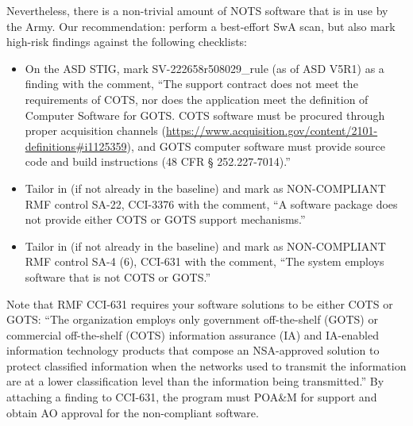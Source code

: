 Nevertheless, there is a non-trivial amount of NOTS software that is in use by the Army. Our recommendation: perform a best-effort SwA scan, but also mark high-risk findings against the following checklists:
\begin{itemize}
	\item On the ASD STIG, mark SV-222658r508029\_rule (as of ASD V5R1) as a finding with the comment, ``The support contract does not meet the requirements of COTS, nor does the application meet the definition of Computer Software for GOTS. COTS software must be procured through proper acquisition channels (\url{https://www.acquisition.gov/content/2101-definitions#i1125359}), and GOTS computer software must provide source code and build instructions (48 CFR § 252.227-7014).''
	\item Tailor in (if not already in the baseline) and mark as NON-COMPLIANT RMF control SA-22, CCI-3376 with the comment, ``A software package does not provide either COTS or GOTS support mechanisms.''
	\item Tailor in (if not already in the baseline) and mark as NON-COMPLIANT RMF control SA-4 (6), CCI-631 with the comment, ``The system employs software that is not COTS or GOTS.''
\end{itemize}

Note that RMF CCI-631 requires your software solutions to be either COTS or GOTS: ``The organization employs only government off-the-shelf (GOTS) or commercial off-the-shelf (COTS) information assurance (IA) and IA-enabled information technology products that compose an NSA-approved solution to protect classified information when the networks used to transmit the information are at a lower classification level than the information being transmitted.'' By attaching a finding to CCI-631, the program must POA\&M for support and obtain AO approval for the non-compliant software.
